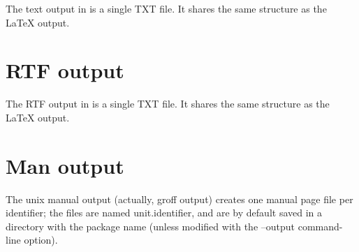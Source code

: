 The text output in \fpdoc is a single TXT file. It shares the same structure
as the LaTeX output.

\section{RTF output}

The RTF output in \fpdoc is a single TXT file. It shares the same structure
as the LaTeX output.

\section{Man output}

The unix manual output (actually, groff output) creates one manual page file 
per identifier; the files are named unit.identifier, and are by default
saved in a directory with the package name (unless modified with the
--output command-line option).


